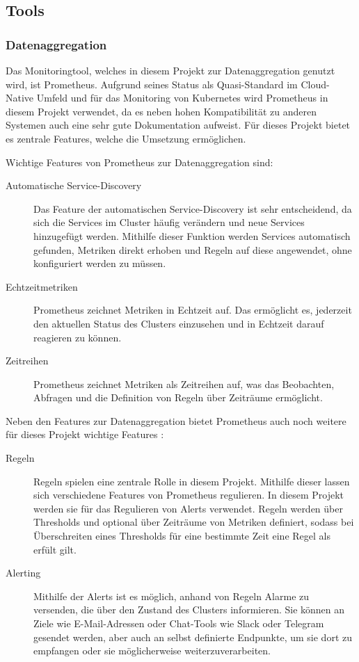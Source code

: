 \documentclass[a4paper,10pt]{scrartcl}
\begin{document}
\subsection{Tools}
\subsubsection{Datenaggregation}

Das Monitoringtool, welches in diesem Projekt zur Datenaggregation genutzt wird, ist Prometheus. Aufgrund seines Status als Quasi-Standard im Cloud-Native Umfeld und für das Monitoring von Kubernetes wird Prometheus in diesem Projekt verwendet, da es neben hohen Kompatibilität zu anderen Systemen auch eine sehr gute Dokumentation aufweist. Für dieses Projekt bietet es zentrale Features, welche die Umsetzung ermöglichen.

Wichtige Features von Prometheus zur Datenaggregation sind:
\begin{description}

\item[Automatische Service-Discovery]
Das Feature der automatischen Service-Discovery ist sehr entscheidend, da sich die Services im Cluster häufig verändern und neue Services hinzugefügt werden. Mithilfe dieser Funktion werden Services automatisch gefunden, Metriken direkt erhoben und Regeln auf diese angewendet, ohne konfiguriert werden zu müssen.
\item[Echtzeitmetriken]
Prometheus zeichnet Metriken in Echtzeit auf. Das ermöglicht es, jederzeit den aktuellen Status des Clusters einzusehen und in Echtzeit darauf reagieren zu können.
\item[Zeitreihen]
Prometheus zeichnet Metriken als Zeitreihen auf, was das Beobachten, Abfragen und die Definition von Regeln über Zeiträume ermöglicht. 

\end{description}


Neben den Features zur Datenaggregation bietet Prometheus auch noch weitere für dieses Projekt wichtige Features :
\begin{description}
\item[Regeln]
Regeln spielen eine zentrale Rolle in diesem Projekt. Mithilfe dieser lassen sich verschiedene Features von Prometheus regulieren. In diesem Projekt werden sie für das Regulieren von Alerts verwendet.
Regeln werden über Thresholds und optional über Zeiträume von Metriken definiert, sodass bei Überschreiten eines Thresholds für eine bestimmte Zeit eine Regel als erfült gilt.
\item[Alerting]
Mithilfe der Alerts ist es möglich, anhand von Regeln Alarme zu versenden, die über den Zustand des Clusters informieren. Sie können an Ziele wie E-Mail-Adressen oder Chat-Tools wie Slack oder Telegram gesendet werden, aber auch  an selbst definierte Endpunkte, um sie dort zu empfangen oder sie möglicherweise weiterzuverarbeiten.

\end{description}
\end{document}
